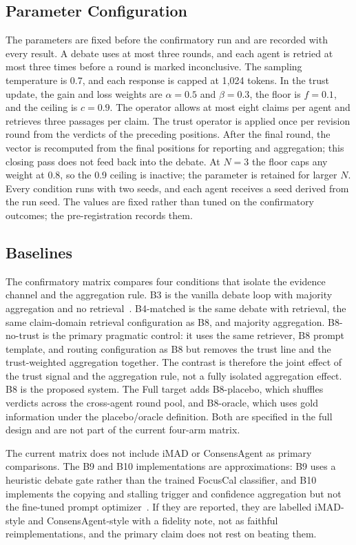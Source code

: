\documentclass[a4paper,fleqn]{cas-sc}
\begin{document}
\subsection{Parameter Configuration}

The parameters are fixed before the confirmatory run and are recorded with every result. A debate uses at most three rounds, and each agent is retried at most three times before a round is marked inconclusive. The sampling temperature is 0.7, and each response is capped at 1{,}024 tokens. In the trust update, the gain and loss weights are $\alpha = 0.5$ and $\beta = 0.3$, the floor is $f = 0.1$, and the ceiling is $c = 0.9$. The operator allows at most eight claims per agent and retrieves three passages per claim. The trust operator is applied once per revision round from the verdicts of the preceding positions. After the final round, the vector is recomputed from the final positions for reporting and aggregation; this closing pass does not feed back into the debate. At $N=3$ the floor caps any weight at 0.8, so the 0.9 ceiling is inactive; the parameter is retained for larger $N$. Every condition runs with two seeds, and each agent receives a seed derived from the run seed. The values are fixed rather than tuned on the confirmatory outcomes; the pre-registration records them.

\subsection{Baselines}

The confirmatory matrix compares four conditions that isolate the evidence channel and the aggregation rule. B3 is the vanilla debate loop with majority aggregation and no retrieval~\cite{du2024improving}. B4-matched is the same debate with retrieval, the same claim-domain retrieval configuration as B8, and majority aggregation. B8-no-trust is the primary pragmatic control: it uses the same retriever, B8 prompt template, and routing configuration as B8 but removes the trust line and the trust-weighted aggregation together. The contrast is therefore the joint effect of the trust signal and the aggregation rule, not a fully isolated aggregation effect. B8 is the proposed system. The Full target adds B8-placebo, which shuffles verdicts across the cross-agent round pool, and B8-oracle, which uses gold information under the placebo/oracle definition. Both are specified in the full design and are not part of the current four-arm matrix.

The current matrix does not include iMAD or ConsensAgent as primary comparisons. The B9 and B10 implementations are approximations: B9 uses a heuristic debate gate rather than the trained FocusCal classifier, and B10 implements the copying and stalling trigger and confidence aggregation but not the fine-tuned prompt optimizer~\cite{fan2026imad,pitre-etal-2025-consensagent}. If they are reported, they are labelled iMAD-style and ConsensAgent-style with a fidelity note, not as faithful reimplementations, and the primary claim does not rest on beating them.
\end{document}
